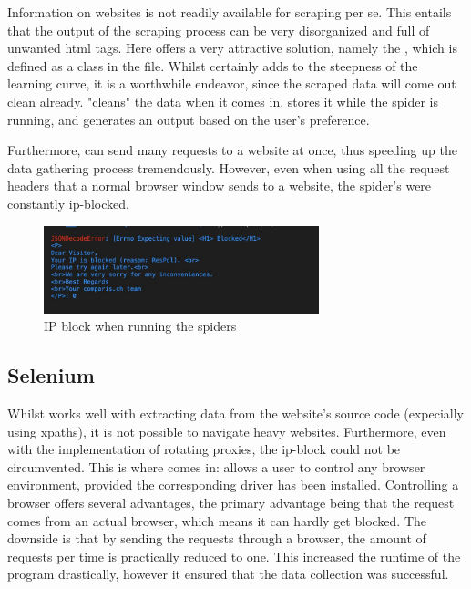 \documentclass[main]{subfiles}
\begin{document}
Information on websites is not readily available for scraping per se.
This entails that the output of the scraping process can be very disorganized and full of unwanted \acs*{html} tags.
Here \scrapy offers a very attractive solution, namely the \pkg[ItemLoader], which is defined as a class in the \pkg[items.py] file.
Whilst \pkg[ItemLoader] certainly adds to the steepness of the learning curve, it is a worthwhile endeavor, 
since the scraped data will come out clean already. 
\pkg[ItemLoader] "cleans" the data when it comes in, stores it while the spider is running, and generates an output based on the user's preference.

Furthermore, \scrapy can send many requests to a website at once, thus speeding up the data gathering process tremendously.
However, even when using all the request headers that a normal browser window sends to a website, 
the \scrapy spider's were constantly \acs*{ip}-blocked.

\begin{figure}[htbp]
    \centerline{
        \includegraphics[width = 80mm]{prog_2.png}}
    \caption{IP block when running the spiders}
    \label{fig:block}
\end{figure}

\subsection{Selenium}
Whilst \scrapy works well with extracting data from the website's source code (expecially using \acsp*{xpath}), 
it is not possible to navigate \js heavy websites.
Furthermore, even with the implementation of rotating proxies, the \acs*{ip}-block could not be circumvented.
This is where \selenium comes in: \selenium allows a user to control any browser environment,
provided the corresponding driver has been installed.
Controlling a browser offers several advantages, the primary advantage being that the request comes from an actual browser,
which means it can hardly get blocked. 
The downside is that by sending the requests through a browser, the amount of requests per time is practically reduced to one.
This increased the runtime of the program drastically, however it ensured that the data collection was successful.
\end{document}

